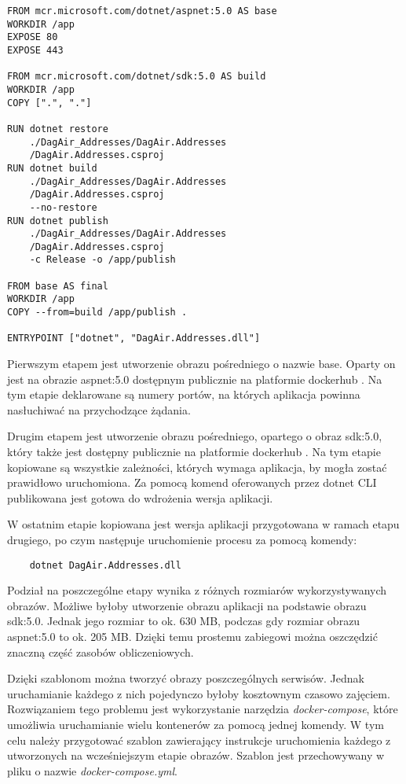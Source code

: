 \begin{lstlisting}
FROM mcr.microsoft.com/dotnet/aspnet:5.0 AS base
WORKDIR /app
EXPOSE 80
EXPOSE 443

FROM mcr.microsoft.com/dotnet/sdk:5.0 AS build
WORKDIR /app
COPY [".", "."]

RUN dotnet restore 
    ./DagAir_Addresses/DagAir.Addresses
    /DagAir.Addresses.csproj
RUN dotnet build 
    ./DagAir_Addresses/DagAir.Addresses
    /DagAir.Addresses.csproj 
    --no-restore
RUN dotnet publish 
    ./DagAir_Addresses/DagAir.Addresses
    /DagAir.Addresses.csproj 
    -c Release -o /app/publish

FROM base AS final
WORKDIR /app
COPY --from=build /app/publish .

ENTRYPOINT ["dotnet", "DagAir.Addresses.dll"]
\end{lstlisting}

Pierwszym etapem jest utworzenie obrazu pośredniego o nazwie base. Oparty on jest na obrazie 
aspnet:5.0 dostępnym publicznie na platformie dockerhub \cite{aspnet2022}.
Na tym etapie deklarowane są
numery portów, na których aplikacja powinna nasłuchiwać na przychodzące żądania.

Drugim etapem jest utworzenie obrazu pośredniego, opartego o obraz sdk:5.0, który także jest dostępny publicznie
na platformie dockerhub \cite{dotnetsdk2022}. Na tym etapie kopiowane
są wszystkie zależności, których wymaga aplikacja, by mogła zostać prawidłowo uruchomiona.
Za pomocą komend oferowanych przez dotnet CLI publikowana jest gotowa do wdrożenia wersja aplikacji.

W ostatnim etapie kopiowana jest wersja aplikacji przygotowana w ramach etapu drugiego, po czym
następuje uruchomienie procesu za pomocą komendy:

\begin{lstlisting}
    dotnet DagAir.Addresses.dll
\end{lstlisting}

Podział na poszczególne etapy wynika z różnych rozmiarów wykorzystywanych obrazów. Możliwe byłoby
utworzenie obrazu aplikacji na podstawie obrazu sdk:5.0. Jednak jego rozmiar to ok. 630 MB, podczas
gdy rozmiar obrazu aspnet:5.0 to ok. 205 MB. Dzięki temu prostemu zabiegowi można oszczędzić 
znaczną część zasobów obliczeniowych. 

Dzięki szablonom można tworzyć obrazy poszczególnych serwisów. Jednak uruchamianie każdego z nich
pojedynczo byłoby kosztownym czasowo zajęciem. Rozwiązaniem tego problemu jest wykorzystanie narzędzia
\textit{docker-compose}, które umożliwia uruchamianie wielu kontenerów za pomocą jednej komendy. W tym celu
należy przygotować szablon zawierający instrukcje uruchomienia każdego z utworzonych na wcześniejszym
etapie obrazów. Szablon jest przechowywany w pliku o nazwie \textit{docker-compose.yml}.

